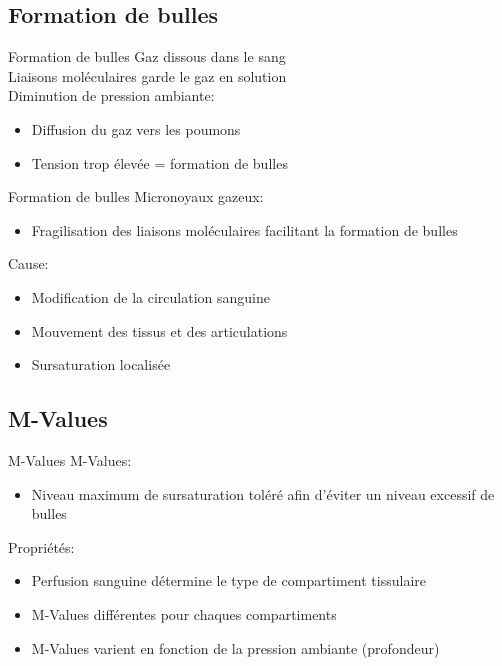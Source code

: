 \subsection{Formation de bulles}

\begin{frame}{Formation de bulles}  
	Gaz dissous dans le sang\\
	Liaisons moléculaires garde le gaz en solution\\
	Diminution de pression ambiante:
	\begin{itemize}
		\item Diffusion du gaz vers les poumons
		\item Tension trop élevée = formation de bulles
	\end{itemize}
\end{frame}

\begin{frame}{Formation de bulles}
	Micronoyaux gazeux:
	\begin{itemize}
		\item Fragilisation des liaisons moléculaires facilitant la formation de bulles
	\end{itemize}
	\vfill
	Cause:
	\begin{itemize}
		\item Modification de la circulation sanguine
		\item Mouvement des tissus et des articulations
		\item Sursaturation localisée
	\end{itemize}
\end{frame}

\subsection{M-Values}

\begin{frame}{M-Values}  
	M-Values:
	\begin{itemize}
		\item Niveau maximum de sursaturation toléré afin d'éviter un niveau excessif de bulles
	\end{itemize}
	\vfill
	Propriétés:
	\begin{itemize}
		\item Perfusion sanguine détermine le type de compartiment tissulaire
		\item M-Values différentes pour chaques compartiments
		\item M-Values varient en fonction de la pression ambiante (profondeur)
	\end{itemize}
\end{frame}

